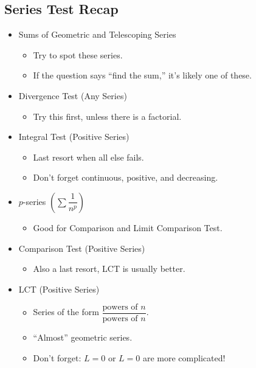 \subsection*{Series Test Recap}
\begin{itemize}
    \item Sums of Geometric and Telescoping Series
          \begin{itemize}
              \item Try to spot these series.
              \item If the question says ``find the sum,'' it's likely one of these.
          \end{itemize}
    \item Divergence Test (Any Series)
          \begin{itemize}
              \item Try this first, unless there is a factorial.
          \end{itemize}
    \item Integral Test (Positive Series)
          \begin{itemize}
              \item Last resort when all else fails.
              \item Don't forget continuous, positive, and decreasing.
          \end{itemize}
    \item $ p $-series $ \left( \sum \dfrac{1}{n^p} \right) $
          \begin{itemize}
              \item Good for Comparison and Limit Comparison Test.
          \end{itemize}
    \item Comparison Test (Positive Series)
          \begin{itemize}
              \item Also a last resort, LCT is usually better.
          \end{itemize}
    \item LCT (Positive Series)
          \begin{itemize}
              \item Series of the form $ \dfrac{\text{powers of }n}{\text{powers of }n} $.
              \item ``Almost'' geometric series.
              \item Don't forget: $ L=0 $ or $ L=0 $ are more complicated!
          \end{itemize}

\end{itemize}
